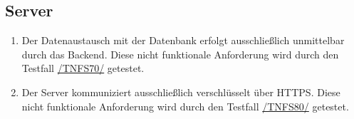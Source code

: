 \subsection*{Server}

\begin{samepage}
    \begin{enumerate}[label=\textbf{/NFS\arabic*0/}, align=left, start=7]
        \item \label{/NFS70/} Der \Gls{Datenaustausch} mit der \Gls{Datenbank} erfolgt ausschließlich unmittelbar durch das \Gls{Backend}. Diese nicht funktionale Anforderung wird durch den Testfall \hyperref[/TNFS70/]{/TNFS70/} getestet.
        \item \label{/NFS80/} Der \Gls{Server} kommuniziert ausschließlich verschlüsselt über \Gls{HTTPS}. Diese nicht funktionale Anforderung wird durch den Testfall \hyperref[/TNFS80/]{/TNFS80/} getestet.
    \end{enumerate}
\end{samepage}